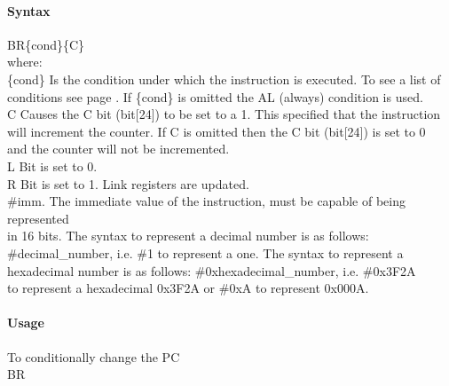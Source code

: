 \documentclass[12pt]{article}
\begin{document}
    \paragraph{Syntax}
    \begin{flushleft}
    BR\{cond\}\{C\} \\
    \vspace{1em}        %
    where:\\
    \vspace{1em}
    \{cond\}    \hspace{2em} Is the condition under which the instruction is executed. To see a list of\\
                \hspace{5.4em} conditions see page . If \{cond\} is omitted the AL (always) condition is used.\\
    \vspace{1em}
    C       \hspace{4.5em} Causes the C bit (bit[24]) to be set to a 1. This specified that the instruction\\
            \hspace{5.4em} will increment the counter. If C is omitted then the C bit (bit[24]) is set to 0\\
            \hspace{5.4em} and the counter will not be incremented.\\
    \vspace{1em}
    L       \hspace{4.5em} Bit is set to 0.\\
    \vspace{1em}
    R       \hspace{4.5em} Bit is set to 1. Link registers are updated.\\
    \vspace{1em}
    \#imm.  \hspace{1.8em} The immediate value of the instruction, must be capable of being represented\\              \hspace{5.4em} in 16 bits. The syntax to represent a decimal number is as follows:\\
            \hspace{5.4em} \#decimal\_number, i.e. \#1 to represent a one. The syntax to represent a\\
            \hspace{5.4em} hexadecimal number is as follows: \#0xhexadecimal\_number, i.e. \#0x3F2A \\
            \hspace{5.4em} to represent a hexadecimal 0x3F2A or \#0xA to represent 0x000A.\\
    \end{flushleft}
    
    \paragraph{Usage}
    \begin{flushleft}
    To conditionally change the PC \\
    \vspace{1em}
    BR
    \end{flushleft}

    
\end{document}
